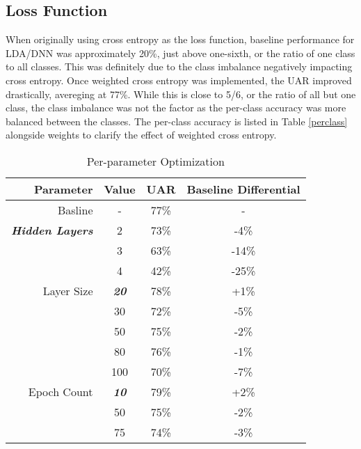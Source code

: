 	 \subsection{Loss Function}
	 When originally using cross entropy as the loss function, baseline performance for LDA/DNN was approximately 20\%, just above one-sixth, or the ratio of one class to all classes. This was definitely due to the class imbalance negatively impacting cross entropy. Once weighted cross entropy was implemented, the UAR improved drastically, avereging at 77\%. While this is close to 5/6, or the ratio of all but one class, the class imbalance was not the factor as the per-class accuracy was more balanced between the classes. The per-class accuracy is listed in Table \ref{perclass} alongside weights to clarify the effect of weighted cross entropy.
\begin{table}[!hbt]
	\centering
	\caption{Per-parameter Optimization}
	\begin{tabular}{|r|c|c|c|}
		\hline
		Parameter                       & Value                   & UAR  & Baseline Differential \\ \hline
		Basline                         & -                       & 77\% & -                     \\ \hline
		\textit{\textbf{Hidden Layers}} & 2                       & 73\% & -4\%                  \\ \cline{2-4} 
		& 3                       & 63\% & -14\%                 \\ \cline{2-4} 
		& 4                       & 42\% & -25\%                 \\ \hline
		Layer Size                      & \textit{\textbf{20}}    & 78\% & +1\%                  \\ \cline{2-4} 
		& 30                      & 72\% & -5\%                  \\ \cline{2-4} 
		& 50                      & 75\% & -2\%                  \\ \cline{2-4} 
		& 80                      & 76\% & -1\%                  \\ \cline{2-4} 
		& 100                     & 70\% & -7\%                  \\ \hline
		Epoch Count                     & \textit{\textbf{10}}    & 79\% & +2\%                  \\ \cline{2-4} 
		& 50                      & 75\% & -2\%                  \\ \cline{2-4} 
		& 75                      & 74\% & -3\%                  \\ \cline{2-4} 

\end{tabular}
\end{table}
